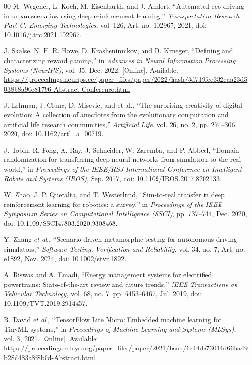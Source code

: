 \documentclass{ieeeaccess}
\begin{document}
\begin{thebibliography}{00}
 M. Wegener, L. Koch, M. Eisenbarth, and J. Andert, ``Automated eco-driving in urban scenarios using deep reinforcement learning,'' \emph{Transportation Research Part C: Emerging Technologies}, vol. 126, Art. no. 102967, 2021, doi: 10.1016/j.trc.2021.102967.

 J. Skalse, N. H. R. Howe, D. Krasheninnikov, and D. Krueger, ``Defining and characterizing reward gaming,'' in \emph{Advances in Neural Information Processing Systems (NeurIPS)}, vol. 35, Dec. 2022. [Online]. Available: \url{https://proceedings.neurips.cc/paper_files/paper/2022/hash/3d719fee332caa23d5038b8a90e81796-Abstract-Conference.html}

 J. Lehman, J. Clune, D. Misevic, and et al., ``The surprising creativity of digital evolution: A collection of anecdotes from the evolutionary computation and artificial life research communities,'' \emph{Artificial Life}, vol. 26, no. 2, pp. 274--306, 2020, doi: 10.1162/artl\_a\_00319.

 J. Tobin, R. Fong, A. Ray, J. Schneider, W. Zaremba, and P. Abbeel, ``Domain randomization for transferring deep neural networks from simulation to the real world,'' in \emph{Proceedings of the IEEE/RSJ International Conference on Intelligent Robots and Systems (IROS)}, Sep. 2017, doi: 10.1109/IROS.2017.8202133.

 W. Zhao, J. P. Queralta, and T. Westerlund, ``Sim-to-real transfer in deep reinforcement learning for robotics: a survey,'' in \emph{Proceedings of the IEEE Symposium Series on Computational Intelligence (SSCI)}, pp. 737--744, Dec. 2020, doi: 10.1109/SSCI47803.2020.9308468.

 Y. Zhang \emph{et al.}, ``Scenario-driven metamorphic testing for autonomous driving simulators,'' \emph{Software Testing, Verification and Reliability}, vol. 34, no. 7, Art. no. e1892, Nov. 2024, doi: 10.1002/stvr.1892.

 A. Biswas and A. Emadi, ``Energy management systems for electrified powertrains: State-of-the-art review and future trends,'' \emph{IEEE Transactions on Vehicular Technology}, vol. 68, no. 7, pp. 6453--6467, Jul. 2019, doi: 10.1109/TVT.2019.2914457.

 R. David \emph{et al.}, ``TensorFlow Lite Micro: Embedded machine learning for TinyML systems,'' in \emph{Proceedings of Machine Learning and Systems (MLSys)}, vol. 3, 2021. [Online]. Available: \url{https://proceedings.mlsys.org/paper_files/paper/2021/hash/6c44dc73014d66ba49b28d483a8f8b0d-Abstract.html}


\end{thebibliography}
\end{document}
